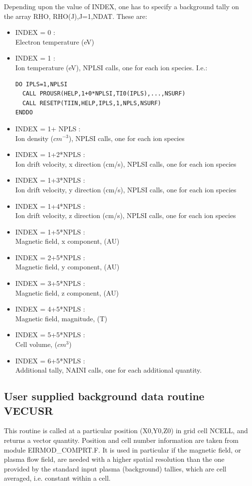 Depending upon the value of INDEX, one has to specify a background tally
on the array RHO, RHO(J),J=1,NDAT.
These are:
\begin{itemize}
\item
INDEX = 0     : \\
Electron temperature (eV)
\item
INDEX = 1     :\\
Ion temperature (eV), NPLSI calls, one for each
ion species. I.e.:
\begin{verbatim}
DO IPLS=1,NPLSI
  CALL PROUSR(HELP,1+0*NPLSI,TI0(IPLS),...,NSURF)
  CALL RESETP(TIIN,HELP,IPLS,1,NPLS,NSURF)
ENDDO
\end{verbatim}
\item
INDEX = 1+ NPLS     : \\
Ion density ($cm^{-3}$), NPLSI calls, one for each
ion species
\item
INDEX = 1+2*NPLS    :   \\
Ion drift velocity, x direction (cm/s), NPLSI calls, one for each
ion species
\item
INDEX = 1+3*NPLS    :   \\
Ion drift velocity, y direction (cm/s), NPLSI calls, one for each
ion species
\item
INDEX = 1+4*NPLS    :   \\
Ion drift velocity, z direction (cm/s), NPLSI calls, one for each
ion species
\item
INDEX = 1+5*NPLS    :   \\
Magnetic field, x component, (AU)
\item
INDEX = 2+5*NPLS    :   \\
Magnetic field, y component, (AU)
\item
INDEX = 3+5*NPLS    :   \\
Magnetic field, z component, (AU)
\item
INDEX = 4+5*NPLS    :   \\
Magnetic field, magnitude, (T)
\item
INDEX = 5+5*NPLS    :   \\
Cell volume, ($cm^3$)
\item
INDEX = 6+5*NPLS    :   \\
Additional tally, NAINI calls, one for each additional quantity.
\end{itemize}

\subsection{User supplied background data routine VECUSR}
\label{sec3.6.2}
This routine is called at a particular position (X0,Y0,Z0) in grid cell NCELL, and returns a vector quantity.
Position and cell number information are taken from module EIRMOD\_COMPRT.F.
It is used in particular if the magnetic field, or plasma flow field, are needed with a higher spatial
resolution than the one provided by the standard input plasma (background) tallies, which are cell averaged,
i.e. constant within a cell.

